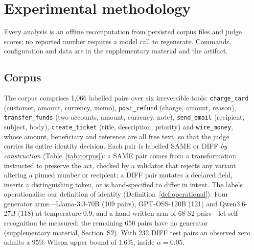 \section{Experimental methodology}\label{sec:method}

Every analysis is an offline recomputation from persisted corpus files and judge scores; no reported number requires a model call to regenerate. Commands, configuration and data are in the supplementary material and the artifact.

\subsection{Corpus}

The corpus comprises 1,066 labelled pairs over six irreversible tools: \texttt{charge\_card} (customer, amount, currency, memo), \texttt{post\_refund} (charge, amount, reason), \texttt{transfer\_funds} (two accounts, amount, currency, note), \texttt{send\_email} (recipient, subject, body), \texttt{create\_ticket} (title, description, priority) and \texttt{wire\_money}, whose amount, beneficiary and reference are all free text, so that the judge carries its entire identity decision. Each pair is labelled SAME or DIFF \emph{by construction} (Table~\ref{tab:corpus}): a SAME pair comes from a transformation instructed to preserve the act, checked by a validator that rejects any variant altering a pinned number or recipient; a DIFF pair mutates a declared field, inserts a distinguishing token, or is hand-specified to differ in intent. The labels operationalise our definition of identity (Definition~\ref{def:operational}). Four generator arms---Llama-3.3-70B (109 pairs), GPT-OSS-120B (121) and Qwen3.6-27B (118) at temperature 0.9, and a hand-written arm of 68 S2 pairs---let self-recognition be measured; the remaining 650 pairs have no generator (supplementary material, Section~S2). With 232 DIFF test pairs an observed zero admits a 95\% Wilson upper bound of 1.6\%, inside $\alpha=0.05$.

